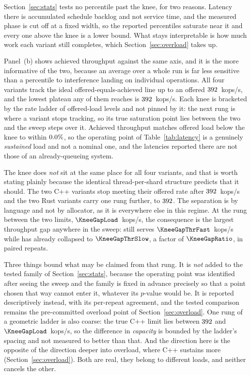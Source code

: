 \documentclass[english,oneside,a4paper,censored,csm,software-track-2020]{HYthesisML}
\begin{document}
Section~\ref{sec:stats} tests no percentile past the knee, for two reasons. Latency there is
accumulated schedule backlog and not service time, and the measured phase is cut off at a fixed
width, so the reported percentiles saturate near it and every one above the knee is a lower bound.
What stays interpretable is how much work each variant still completes, which
Section~\ref{sec:overload} takes up.

Panel~(b) shows achieved throughput against the same axis, and it is the
more informative of the two, because an average over a whole run is far less sensitive than
a percentile to interference landing on individual operations. All four variants track the ideal
offered-equals-achieved line up to an offered $392$~kops/s, and the lowest plateau any of
them reaches is $392$~kops/s. Each knee is bracketed by the rate ladder of offered-load
levels and not pinned by it: the next rung is where a variant stops tracking, so its true
saturation point lies between the two and
the sweep steps over it. Achieved throughput matches offered load below the knee to within
$0.0\%$, so the operating point of Table~\ref{tab:latency} is a genuinely
\emph{sustained} load and not a nominal one, and the latencies reported there are not those of an
already-queueing system.

The knee does \emph{not} sit at the same place for all four variants, and that is worth stating
plainly because the identical thread-per-shard structure predicts that it should. The two C++ variants
stop meeting their offered rate after $392$~kops/s and the two Rust variants carry one rung
further, to $392$. The separation is by language and not by allocator, as it is
everywhere else in this regime. At the rung between the two limits, $\KneeGapLoad$~kops/s, the
consequence is the largest throughput gap anywhere in the sweep: \KneeGapFaster{} still serves
$\KneeGapThrFast$~kops/s while \KneeGapSlower{} has already collapsed to $\KneeGapThrSlow$, a factor
of $\KneeGapRatio$, in \KneeGapAgree{} paired repeats.

Three things bound what may be claimed from that rung. It is \emph{not} added to the tested family of
Section~\ref{sec:stats}, because the operating point was identified after seeing the sweep and the
family is fixed in advance precisely so that a point chosen that way cannot enter it, whatever its
$p$-value would be. It is reported descriptively instead, with its per-repeat agreement, and the
tested comparison remains the pre-committed overload point of Section~\ref{sec:overload}. One rung
of a geometric ladder is also coarse: the true C++ limit lies between $392$ and
$\KneeGapLoad$~kops/s, so the difference in \emph{capacity} is bounded by the ladder's spacing and
not measured to better than that. And the direction here is the opposite of the direction deeper into
overload, where C++ sustains more (Section~\ref{sec:overload}). Both are real, they belong to
different loads, and neither cancels the other.
\end{document}

